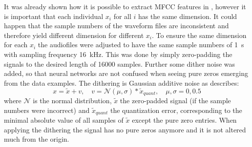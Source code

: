 It was already shown how it is possible to extract MFCC features in , however it is important that each individual $x_i$ for all $i$ has the same dimension.
It could happen that the sample numbers of the waveform files are inconsistent and therefore yield different dimension for different $x_i$.
To ensure the same dimension for each $x_i$ the audiofiles were adjusted to have the same sample numbers of \SI{1}{\second} with sampling frequency \SI{16}{\kilo\hertz}.
This was done by simply zero-padding the signals to the desired length of 16000 samples.
Further some dither noise was added, so that neural networks are not confused when seeing pure zeros emerging from the data examples.
The dithering is Gaussian additive noise as describes:
\begin{equation}\label{eq:exp_dither}
  x = \tilde{x} + v, \quad v = \mathcal{N}(\mu, \sigma) * \tilde{x}_{quant}, \quad \mu, \sigma = 0, 0.5
\end{equation}
where $\mathcal{N}$ is the normal distribution, $\tilde{x}$ the zero-padded signal (if the sample numbers were incorrect) and $\tilde{x}_{quant}$ the quantization error, corresponding to the minimal absolute value of all samples of $\tilde{x}$ except the pure zero entries.
When applying the dithering the signal has no pure zeros anymore and it is not altered much from the origin.


